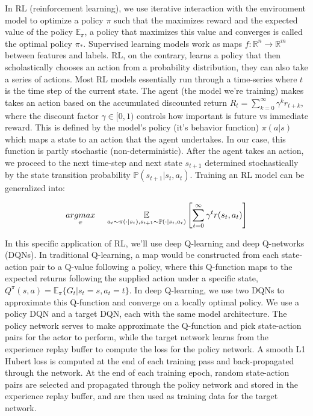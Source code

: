 \documentclass{article}
\begin{document}
\begin{spacing}{2.0}
In RL (reinforcement learning), we use iterative interaction with the environment model to optimize a policy $\pi$ such that the maximizes reward and the expected value
of the policy $\mathbb{E}_{\pi}$, a policy that maximizes this value and converges is called the optimal policy $\pi_{*}$. Supervised learning models work as maps
$f: \mathbb{R}^{n} \rightarrow \mathbb{R}^{m}$ between features and labels. RL, on the contrary, learns a policy that then scholastically chooses an action
from a probability distribution, they can also take a series of actions. Most RL models essentially run through a time-series where $t$ is the time step of
the current state. The agent (the model we're training) makes takes an action based on the accumulated discounted return $R_{t} = \sum\limits_{k = 0}^{\infty} \gamma^{k} r_{t + k}$,
where the discount factor $\gamma \in [0, 1)$ controls how important is future vs immediate reward. This is defined by the model's policy (it's behavior function)
$\pi \left ( a | s \right )$ which maps a state to an action that the agent undertakes. In our case, this function is partly stochastic (non-deterministic).
After the agent takes an action, we proceed to the next time-step and next state $s_{t + 1}$ determined stochastically by the state transition probability
$\mathbb{P}(s_{t + 1} | s_{t}, a_{t})$. Training an RL model can be generalized into:

\begin{gather*}
    \underset{\pi}{argmax} \hspace{0.5cm} \underset{a_{t} \sim \pi(\cdot |s_{t}), s_{t + 1} \sim \mathbb{P} (\cdot | s_{t}, a_{t})  }{\mathbb{E}} \left [ \sum\limits_{t = 0}^{\infty} \gamma^{t} r(s_{t}, a_{t}) \right ]
\end{gather*}

In this specific application of RL, we'll use deep Q-learning and deep Q-networks (DQNs). In traditional Q-learning, a map would be constructed from each state-action
pair to a Q-value following a policy, where this Q-function maps to the expected returns following the supplied action under a specific state,
$Q^{\pi}(s, a) = \mathbb{E}_{\pi} \{ G_{t} | s_{t} = s, a_{t} = t \}$. In deep Q-learning, we use two DQNs to approximate this Q-function and converge on a
locally optimal policy. We use a policy DQN and a target DQN, each with the same model architecture. The policy network serves to make approximate the Q-function and
pick state-action pairs for the actor to perform, while the target network learns from the experience replay buffer to compute the loss for the policy network.
A smooth L1 Hubert loss is computed at the end of each training pass and back-propagated through the network. At the end of each training epoch, random state-action pairs
are selected and propagated through the policy network and stored in the experience replay buffer, and are then used as training data for the target network.


\end{spacing}
\end{document}
